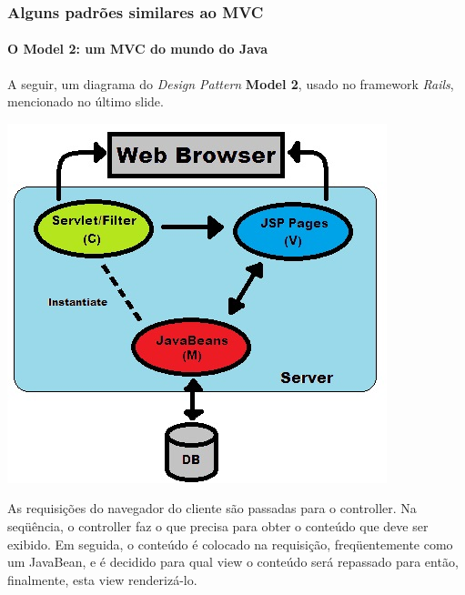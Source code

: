 \documentclass{beamer}
\begin{document}
\begin{frame}
\frametitle{Alguns padrões similares ao MVC}
\framesubtitle{O Model 2: um MVC do mundo do Java}
	A seguir, um diagrama do \textit{Design Pattern} \textbf{Model 2}, usado no framework \textit{Rails}, mencionado no último slide.
	\begin{center}
		\includegraphics[scale=0.2]{Model2.jpg}
	\end{center}
	As requisições do navegador do cliente são passadas para o controller. Na seqüência, o controller faz o que precisa para obter o conteúdo que deve ser exibido.
	Em seguida, o conteúdo é colocado na requisição, freqüentemente como um JavaBean, e é decidido para qual view o conteúdo será repassado para então, finalmente, esta
	view renderizá-lo.
\end{frame}
\end{document}
